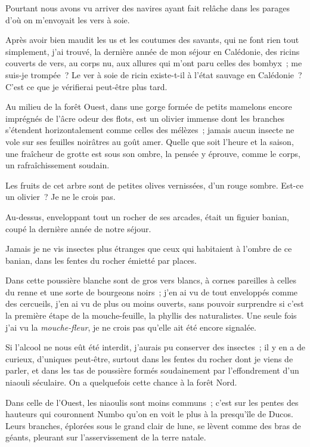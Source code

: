 \documentclass[french,twoside]{book} %
\begin{document}
Pourtant nous avons vu arriver des navires  ayant fait relâche dans les parages d’où on m’envoyait les vers à soie.\par
Après avoir bien maudit les us et les coutumes des savants, qui ne font rien tout simplement, j’ai trouvé, la dernière année de mon séjour en Calédonie, des ricins couverts de vers, au corps nu, aux allures qui m’ont paru celles des bombyx ; me suis-je trompée ? Le ver à soie de ricin existe-t-il à l’état sauvage en Calédonie ? C’est ce que je vérifierai peut-être plus tard.\par
Au milieu de la forêt Ouest, dans une gorge formée de petits mamelons encore imprégnés de l’âcre odeur des flots, est un olivier immense dont les branches s’étendent horizontalement comme celles des mélèzes ; jamais aucun insecte ne vole sur ses feuilles noirâtres au goût amer. Quelle que soit l’heure et la saison, une fraîcheur de grotte est sous son ombre, la pensée y éprouve, comme le corps, un rafraîchissement soudain.\par
Les fruits de cet arbre sont de petites olives vernissées, d’un rouge sombre. Est-ce un olivier ? Je ne le crois pas.\par
Au-dessus, enveloppant tout un rocher de ses arcades, était un figuier banian, coupé la dernière année de notre séjour.\par
Jamais je ne vis insectes plus étranges que  ceux qui habitaient à l’ombre de ce banian, dans les fentes du rocher émietté par places.\par
Dans cette poussière blanche sont de gros vers blancs, à cornes pareilles à celles du renne et une sorte de bourgeons noirs ; j’en ai vu de tout enveloppés comme des cercueils, j’en ai vu de plus ou moins ouverts, sans pouvoir surprendre si c’est la première étape de la mouche-feuille, la phyllis des naturalistes. Une seule fois j’ai vu la \emph{mouche-fleur}, je ne crois pas qu’elle ait été encore signalée.\par
Si l’alcool ne nous eût été interdit, j’aurais pu conserver des insectes ; il y en a de curieux, d’uniques peut-être, surtout dans les fentes du rocher dont je viens de parler, et dans les tas de poussière formés soudainement par l’effondrement d’un niaouli séculaire. On a quelquefois cette chance à la forêt Nord.\par
Dans celle de l’Ouest, les niaoulis sont moins communs ; c’est sur les pentes des hauteurs qui couronnent Numbo qu’on en voit le plus à la presqu’île de Ducos. Leurs branches, éplorées sous le grand clair de lune, se lèvent comme des bras de géants, pleurant sur l’asservissement de la terre natale.\par
\end{document}
